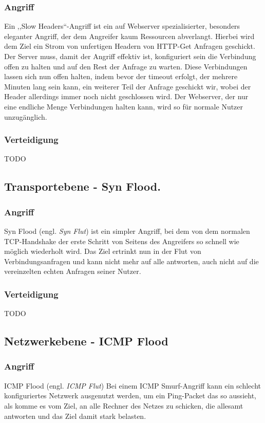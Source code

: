 \documentclass[12pt,a4paper]{article}
\begin{document}
\subsubsection*{Angriff}
Ein ,,Slow Headers``-Angriff ist ein auf Webserver spezialisierter, besonders eleganter Angriff, der dem Angreifer kaum Ressourcen abverlangt. Hierbei wird dem Ziel ein Strom von unfertigen Headern von HTTP-Get Anfragen geschickt. Der Server muss, damit der Angriff effektiv ist, konfiguriert sein die Verbindung offen zu halten und auf den Rest der Anfrage zu warten. Diese Verbindungen lassen sich nun offen halten, indem bevor der timeout erfolgt, der mehrere Minuten lang sein kann, ein weiterer Teil der Anfrage geschickt wir, wobei der Header allerdings immer noch nicht geschlossen wird. Der Webserver, der nur eine endliche Menge Verbindungen halten kann, wird so für normale Nutzer unzugänglich.
\subsubsection*{Verteidigung}
TODO
\subsection{Transportebene - Syn Flood.}
\subsubsection*{Angriff}
Syn Flood (engl. \textit{Syn Flut}) ist ein simpler Angriff, bei dem von dem normalen TCP-Handshake der erste Schritt von Seitens des Angreifers so schnell wie möglich wiederholt wird. Das Ziel ertrinkt nun in der Flut von Verbindungsanfragen und kann nicht mehr auf alle antworten, auch nicht auf die vereinzelten echten Anfragen seiner Nutzer.
\subsubsection*{Verteidigung}
TODO
\subsection{Netzwerkebene - ICMP Flood}
\subsubsection*{Angriff}
ICMP Flood (engl. \textit{ICMP Flut}) Bei einem ICMP Smurf-Angriff kann ein schlecht konfiguriertes Netzwerk ausgenutzt werden, um ein Ping-Packet das so aussieht, als komme es vom Ziel, an alle Rechner des Netzes zu schicken, die allesamt antworten und das Ziel damit stark belasten.
\end{document}
